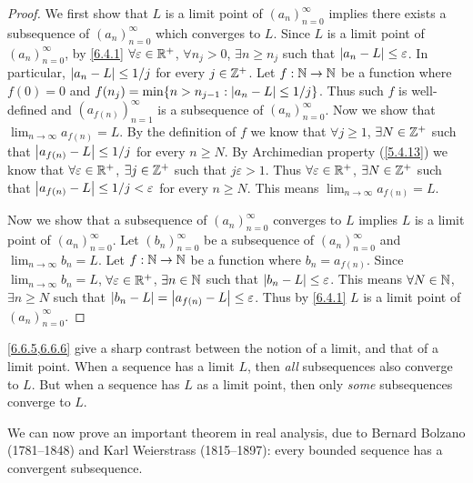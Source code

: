 \begin{proof}
  We first show that \(L\) is a limit point of \((a_n)_{n = 0}^\infty\) implies there exists a subsequence of \((a_n)_{n = 0}^\infty\) which converges to \(L\).
  Since \(L\) is a limit point of \((a_n)_{n = 0}^\infty\), by \cref{6.4.1} \(\forall \varepsilon \in \mathbb{R}^+\), \(\forall n_j > 0\), \(\exists n \geq n_j\) such that \(\left\lvert a_n - L\right\rvert \leq \varepsilon\).
  In particular, \(\left\lvert a_n - L\right\rvert \leq 1 / j\) for every \(j \in \mathbb{Z}^+\).
  Let \(f : \mathbb{N} \to \mathbb{N}\) be a function where \(f(0) = 0\) and \(f(n_j) = \min\set{n > n_{j - 1} : \abs{a_n - L} \leq 1 / j}\).
  Thus such \(f\) is well-defined and \((a_{f(n)})_{n = 1}^\infty\) is a subsequence of \((a_n)_{n = 0}^\infty\).
  Now we show that \(\lim_{n \to \infty} a_{f(n)} = L\).
  By the definition of \(f\) we know that \(\forall j \geq 1\), \(\exists N \in \mathbb{Z}^+\) such that \(\left\lvert a_{f(n)} - L\right\rvert \leq 1 / j\) for every \(n \geq N\).
  By Archimedian property (\cref{5.4.13}) we know that \(\forall \varepsilon \in \mathbb{R}^+\), \(\exists j \in \mathbb{Z}^+\) such that \(j \varepsilon > 1\).
  Thus \(\forall \varepsilon \in \mathbb{R}^+\), \(\exists N \in \mathbb{Z}^+\) such that \(\left\lvert a_{f(n)} - L\right\rvert \leq 1 / j < \varepsilon\) for every \(n \geq N\).
  This means \(\lim_{n \to \infty} a_{f(n)} = L\).

  Now we show that a subsequence of \((a_n)_{n = 0}^\infty\) converges to \(L\) implies \(L\) is a limit point of \((a_n)_{n = 0}^\infty\).
  Let \((b_n)_{n = 0}^\infty\) be a subsequence of \((a_n)_{n = 0}^\infty\) and \(\lim_{n \to \infty} b_n = L\).
  Let \(f : \mathbb{N} \to \mathbb{N}\) be a function where \(b_n = a_{f(n)}\).
  Since \(\lim_{n \to \infty} b_n = L\), \(\forall \varepsilon \in \mathbb{R}^+\), \(\exists n \in \mathbb{N}\) such that \(\left\lvert b_n - L\right\rvert \leq \varepsilon\).
  This means \(\forall N \in \mathbb{N}\), \(\exists n \geq N\) such that \(\left\lvert b_n - L\right\rvert = \left\lvert a_{f(n)} - L\right\rvert \leq \varepsilon\).
  Thus by \cref{6.4.1} \(L\) is a limit point of \((a_n)_{n = 0}^\infty\).
\end{proof}

\begin{rmk}\label{6.6.7}
  \cref{6.6.5,6.6.6} give a sharp contrast between the notion of a limit, and that of a limit point.
  When a sequence has a limit \(L\), then \emph{all} subsequences also converge to \(L\).
  But when a sequence has \(L\) as a limit point, then only \emph{some} subsequences converge to \(L\).
\end{rmk}

\begin{note}
  We can now prove an important theorem in real analysis, due to Bernard Bolzano (1781--1848) and Karl Weierstrass (1815--1897):
  every bounded sequence has a convergent subsequence.
\end{note}

